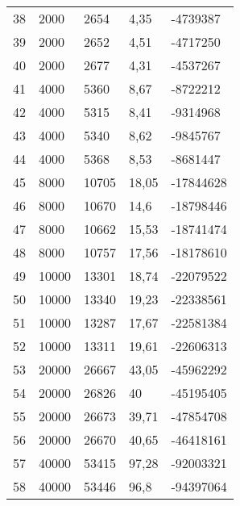 \begin{longtable}{lllll}
    38               & 2000           & 2654           & 4,35      & -4739387        \\
    39               & 2000           & 2652           & 4,51      & -4717250        \\
    40               & 2000           & 2677           & 4,31      & -4537267        \\
    41               & 4000           & 5360           & 8,67      & -8722212        \\
    42               & 4000           & 5315           & 8,41      & -9314968        \\
    43               & 4000           & 5340           & 8,62      & -9845767        \\
    44               & 4000           & 5368           & 8,53      & -8681447        \\
    45               & 8000           & 10705          & 18,05     & -17844628       \\
    46               & 8000           & 10670          & 14,6      & -18798446       \\
    47               & 8000           & 10662          & 15,53     & -18741474       \\
    48               & 8000           & 10757          & 17,56     & -18178610       \\
    49               & 10000          & 13301          & 18,74     & -22079522       \\
    50               & 10000          & 13340          & 19,23     & -22338561       \\
    51               & 10000          & 13287          & 17,67     & -22581384       \\
    52               & 10000          & 13311          & 19,61     & -22606313       \\
    53               & 20000          & 26667          & 43,05     & -45962292       \\
    54               & 20000          & 26826          & 40    & -45195405       \\
    55               & 20000          & 26673          & 39,71     & -47854708       \\
    56               & 20000          & 26670          & 40,65     & -46418161       \\
    57               & 40000          & 53415          & 97,28     & -92003321       \\
    58               & 40000          & 53446          & 96,8      & -94397064       \\

\end{longtable}
